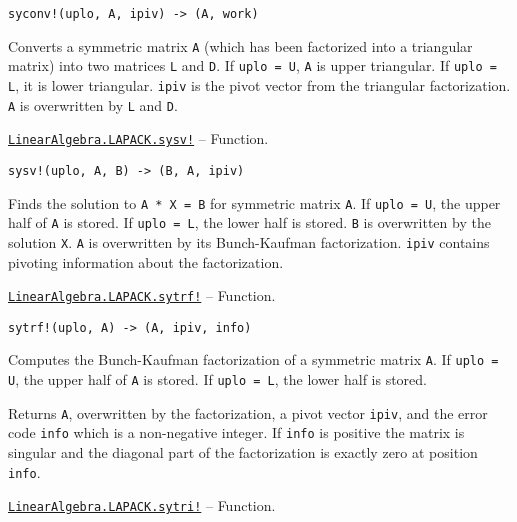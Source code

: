 \begin{adjustwidth}{2em}{0pt}


\begin{verbatim}
syconv!(uplo, A, ipiv) -> (A, work)
\end{verbatim}

Converts a symmetric matrix \texttt{A} (which has been factorized into a triangular matrix) into two matrices \texttt{L} and \texttt{D}. If \texttt{uplo = U}, \texttt{A} is upper triangular. If \texttt{uplo = L}, it is lower triangular. \texttt{ipiv} is the pivot vector from the triangular factorization. \texttt{A} is overwritten by \texttt{L} and \texttt{D}.



\end{adjustwidth}
\hypertarget{9619199705618830828}{}
\hyperlink{9619199705618830828}{\texttt{LinearAlgebra.LAPACK.sysv!}}  -- {Function.}

\begin{adjustwidth}{2em}{0pt}


\begin{verbatim}
sysv!(uplo, A, B) -> (B, A, ipiv)
\end{verbatim}

Finds the solution to \texttt{A * X = B} for symmetric matrix \texttt{A}. If \texttt{uplo = U}, the upper half of \texttt{A} is stored. If \texttt{uplo = L}, the lower half is stored. \texttt{B} is overwritten by the solution \texttt{X}. \texttt{A} is overwritten by its Bunch-Kaufman factorization. \texttt{ipiv} contains pivoting information about the factorization.



\end{adjustwidth}
\hypertarget{4323538288339311968}{}
\hyperlink{4323538288339311968}{\texttt{LinearAlgebra.LAPACK.sytrf!}}  -- {Function.}

\begin{adjustwidth}{2em}{0pt}


\begin{verbatim}
sytrf!(uplo, A) -> (A, ipiv, info)
\end{verbatim}

Computes the Bunch-Kaufman factorization of a symmetric matrix \texttt{A}. If \texttt{uplo = U}, the upper half of \texttt{A} is stored. If \texttt{uplo = L}, the lower half is stored.

Returns \texttt{A}, overwritten by the factorization, a pivot vector \texttt{ipiv}, and the error code \texttt{info} which is a non-negative integer. If \texttt{info} is positive the matrix is singular and the diagonal part of the factorization is exactly zero at position \texttt{info}.



\end{adjustwidth}
\hypertarget{16079738955302816092}{}
\hyperlink{16079738955302816092}{\texttt{LinearAlgebra.LAPACK.sytri!}}  -- {Function.}

